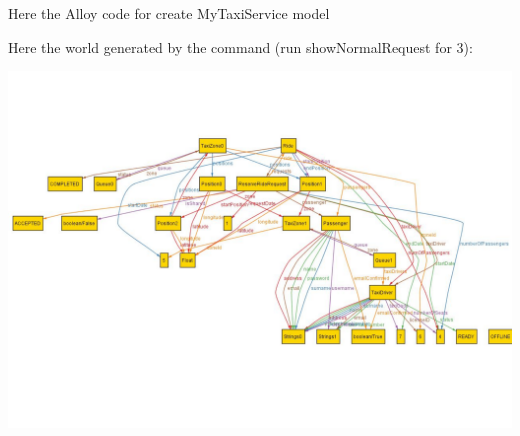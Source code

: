 Here the Alloy code for create MyTaxiService model


Here the world generated by the command (run showNormalRequest for 3):
\begin{center}
	\includegraphics[width=\textwidth]{alloy/alloyNormalRide.pdf}
\end{center}